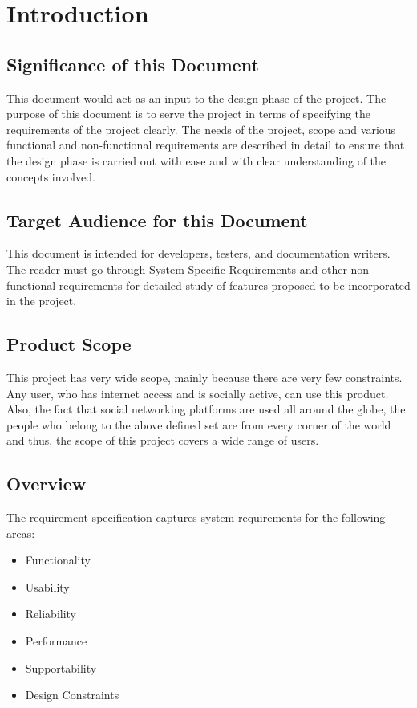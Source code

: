 \documentclass[12pt]{article}
\begin{document}
\section{Introduction}
\subsection{Significance of this Document}
This document would act as an input to the design phase of the project.
The purpose of this document is to serve the project in terms of specifying
the requirements of the project clearly. The needs of the project, scope
and various functional and non-functional requirements are described in
detail to ensure that the design phase is carried out with ease and with
clear understanding of the concepts involved.

\subsection{Target Audience for this Document}
This document is intended for developers, testers, and documentation writers.
The reader must go through System Specific Requirements and other non-functional requirements for detailed study of features proposed to be incorporated in the project.

\subsection{Product Scope}
This project has very wide scope, mainly because there are very few
constraints. Any user, who has internet access and is socially active, can
use this product. Also, the fact that social networking platforms are used
all around the globe, the people who belong to the above defined set are
from every corner of the world and thus, the scope of this project covers
a wide range of users.

\subsection{Overview}
The requirement specification captures system requirements for the
following areas:
\begin{itemize}
    \item Functionality
    \item Usability
    \item Reliability
    \item Performance
    \item Supportability
    \item Design Constraints
 
\end{itemize}
\end{document}
